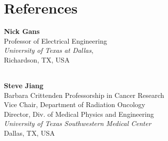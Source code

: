 \section{References}
\noindent
\begin{multicols}{2}
	
	\textbf{Nick Gans}\\
	Professor of Electrical Engineering
	\\
	\emph{University of Texas at  Dallas}, \\
     Richardson, TX, USA
	\\\\
	
%	
	\columnbreak
	
	\textbf{Steve Jiang}\\
	Barbara Crittenden Professorship in Cancer Research \\
	Vice Chair, Department of Radiation Oncology \\
	Director, Div. of Medical Physics and Engineering \\	
	\emph{University of Texas Southwestern Medical Center}\\
	Dallas, TX, USA %
	
	
	
\end{multicols}